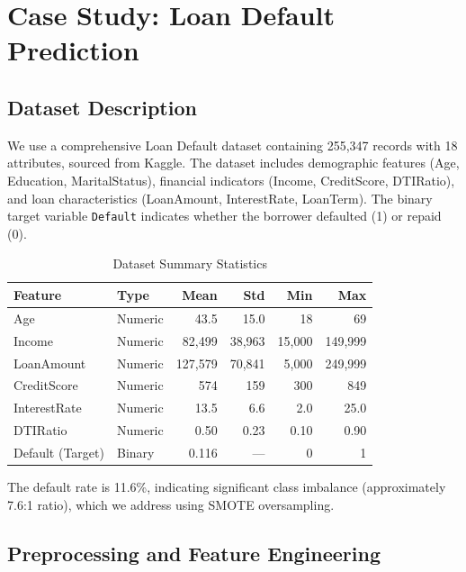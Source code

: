 \documentclass[preprint,12pt,authoryear]{elsarticle}
\begin{document}

\section{Case Study: Loan Default Prediction}
\label{sec:casestudy}

\subsection{Dataset Description}

We use a comprehensive Loan Default dataset containing 255,347 records with 18 attributes, sourced from Kaggle. The dataset includes demographic features (Age, Education, MaritalStatus), financial indicators (Income, CreditScore, DTIRatio), and loan characteristics (LoanAmount, InterestRate, LoanTerm). The binary target variable \texttt{Default} indicates whether the borrower defaulted (1) or repaid (0).

\begin{table}[htbp]
\centering
\caption{Dataset Summary Statistics}
\label{tab:dataset}
\begin{tabular}{@{}llrrrr@{}}
\toprule
Feature & Type & Mean & Std & Min & Max \\
\midrule
Age & Numeric & 43.5 & 15.0 & 18 & 69 \\
Income & Numeric & 82,499 & 38,963 & 15,000 & 149,999 \\
LoanAmount & Numeric & 127,579 & 70,841 & 5,000 & 249,999 \\
CreditScore & Numeric & 574 & 159 & 300 & 849 \\
InterestRate & Numeric & 13.5 & 6.6 & 2.0 & 25.0 \\
DTIRatio & Numeric & 0.50 & 0.23 & 0.10 & 0.90 \\
Default (Target) & Binary & 0.116 & --- & 0 & 1 \\
\bottomrule
\end{tabular}
\end{table}

The default rate is 11.6\%, indicating significant class imbalance (approximately 7.6:1 ratio), which we address using SMOTE oversampling.

\subsection{Preprocessing and Feature Engineering}
\end{document}
